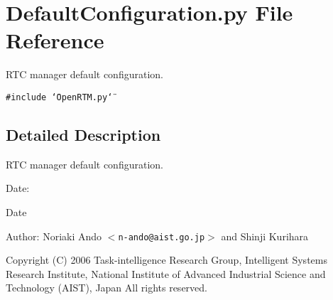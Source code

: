\section{Default\-Configuration.py File Reference}
\label{DefaultConfiguration_8py}
RTC manager default configuration. 

{\tt \#include \char`\"{}Open\-RTM.py\char`\"{}}\par


\subsection{Detailed Description}
RTC manager default configuration. 

\begin{Desc}
\item[Date:]\begin{Desc}
\item[Date]\end{Desc}
\end{Desc}
\begin{Desc}
\item[Author:]Noriaki Ando $<${\tt n-ando@aist.go.jp}$>$ and Shinji Kurihara\end{Desc}
Copyright (C) 2006 Task-intelligence Research Group, Intelligent Systems Research Institute, National Institute of Advanced Industrial Science and Technology (AIST), Japan All rights reserved.